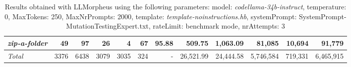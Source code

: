 \begin{table*}
{\begin{tabular}{l||r|r|r|r|r|r||r|r||r|r|r}
   \hline
   \textit{zip-a-folder} & 49 & 97 & 26 & 4 & 67 & 95.88 & 509.75 & 1,063.09 & 81,085 & 10,694 & 91,779 \\ 
   \hline
   \textit{Total} & 3376 & 6438 & 3079 & 3035 & 324 & - & 26,521.99  & 24,444.58 & 5,746,584 & 719,331 & 6,465,915 \\ 
 \end{tabular}
 }
 \caption{Results obtained with LLMorpheus using the following parameters: 
   model: \textit{codellama-34b-instruct}, 
   temperature: 0, 
   MaxTokens: 250, 
   MaxNrPrompts: 2000, 
   template: \textit{template-noinstructions.hb}, 
   systemPrompt: SystemPrompt-MutationTestingExpert.txt, 
   rateLimit: benchmark mode, 
   nrAttempts: 3  
 }
\end{table*}

